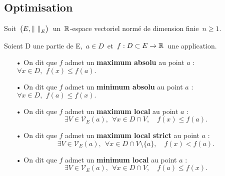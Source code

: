 \subsection{Optimisation}

\vspace{0.7cm}

\begin{center}
    Soit \(\,\bigl(E,\left\lVert\ \right\rVert_E\bigr)\,\) un \(\,\mathbb{R}\)-espace vectoriel normé de dimension finie $\,n\geq 1$.
\end{center}

\vspace{1cm}

Soient D une partie de E, \(\,a\in D\,\) et \(\, f:D\subset E\to \mathbb{R}\,\) une application.
\begin{itemize}[leftmargin=0.5cm]
    \item[•] On dit que $f$ admet un \textbf{maximum absolu} au point $a$ \ssi : \(\, \forall x\in D,\ \, f(x)\leq f(a).\)\vspace{0.2cm}
    
    \item[•] On dit que $f$ admet un \textbf{minimum absolu} au point $a$ \ssi : \(\, \forall x\in D,\ \, f(a)\leq f(x).\)\vspace{0.2cm}
    
    \item[•] On dit que $f$ admet un \textbf{maximum local} au point $a$ \ssi :\vspace{-0.3cm}\\
    \[\exists V\!\in \mathcal{V}_E(a),\ \  \forall x\in D\cap V,\quad f(x)\leq f(a).\]\vspace{-0.4cm}

    \item[•] On dit que $f$ admet un \textbf{maximum local strict} au point $a$ \ssi :\vspace{-0.3cm}\\
    \[\exists V\!\in \mathcal{V}_E(a),\ \  \forall x\in D\cap V\setminus\!\{a\},\quad f(x)< f(a).\]\vspace{-0.4cm}

    \item[•] On dit que $f$ admet un \textbf{minimum local} au point $a$ \ssi :\vspace{-0.3cm}\\
    \[\exists V\!\in \mathcal{V}_E(a),\ \  \forall x\in D\cap V,\quad f(a)\leq f(x).\]\vspace{-0.4cm}


\end{itemize}
